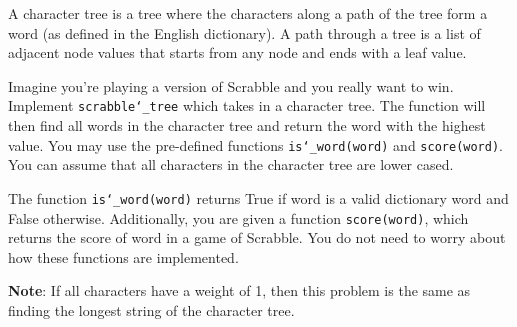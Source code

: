 \begin{blocksection}
\question A character tree is a tree where the characters along a path of the tree form a word (as defined in the English dictionary). A path through a tree is a list of adjacent node values that starts from any node and ends with a leaf value. 

Imagine you're playing a version of Scrabble and you really want to win. Implement \texttt{scrabble\char`_tree} which takes in a character tree. The function will then find all words in the character tree and return the word with the highest value. You may use the pre-defined functions \texttt{is\char`_word(word)} and \texttt{score(word)}. You can assume that all characters in the character tree are lower cased.

The function \texttt{is\char`_word(word)} returns True if word is a valid dictionary word and False otherwise. Additionally, you are given a function \texttt{score(word)}, which returns the score of word in a game of Scrabble. You do not need to worry about how these functions are implemented.

\textbf{Note}: If all characters have a weight of 1, then this problem is the same as finding the longest string of the character tree.
\end{blocksection}


